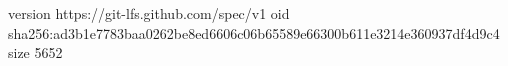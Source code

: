 version https://git-lfs.github.com/spec/v1
oid sha256:ad3b1e7783baa0262be8ed6606c06b65589e66300b611e3214e360937df4d9c4
size 5652
